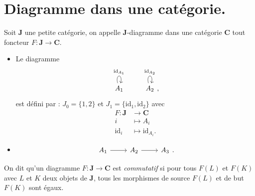 \chapter{Diagramme dans une catégorie.}

\begin{defn}
  Soit $\mathbf{J}$ une petite catégorie, on appelle $\mathbf{J}$-diagramme dans une catégorie $\mathbf{C}$ tout foncteur $F : \mathbf{J} \to  \mathbf{C}$.
\end{defn}

\begin{exm}
  \begin{itemize}
    \item 
      Le diagramme \[
      \begin{tikzcd}
        A_1\arrow[loop above]{}{\mathrm{id}_{A_1}}
        &
        A_2\arrow[loop above]{}{\mathrm{id}_{A_2}}
      \end{tikzcd}
      ,\] 
      est défini par : $J_0 = \{1,2\}$ et $J_1 = \{\mathrm{id}_1, \mathrm{id}_2\}$ avec 
      \begin{align*}
        F: \mathbf{J} &\longrightarrow \mathbf{C} \\
        i &\longmapsto A_i\\
        \mathrm{id}_i &\longmapsto \mathrm{id}_{A_i}
      .\end{align*}
    \item 
      \[
      \begin{tikzcd}
        A_1 \arrow{r}{} & A_2 \arrow{r}{} & A_3
      \end{tikzcd}
      .\] 
  \end{itemize}
\end{exm}

\begin{defn}
  On dit qu'un diagramme $F : \mathbf{J} \to \mathbf{C}$ est \textit{commutatif} si pour tous $F(L)$ et $F(K)$ avec $L$ et $K$ deux objets de $\mathbf{J}$,
  tous les morphismes de source $F(L)$ et de but $F(K)$ sont égaux.
\end{defn}
